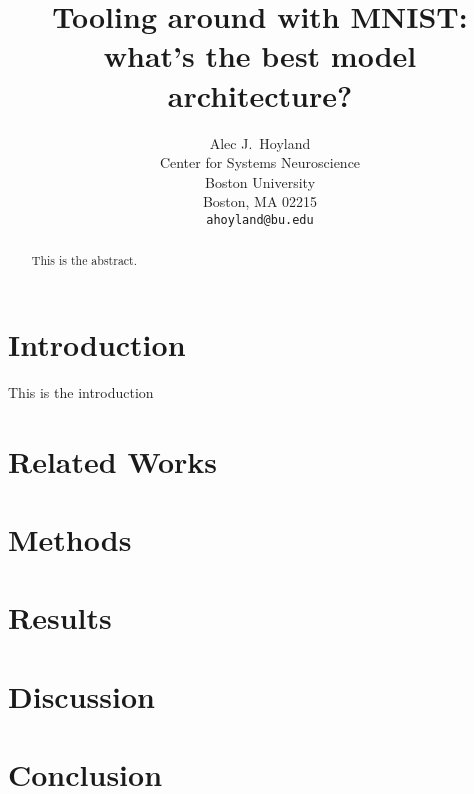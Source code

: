 \documentclass{article}
\title{Tooling around with MNIST: what's the best model architecture?}
\author{%
  Alec J.~Hoyland \\
  Center for Systems Neuroscience\\
  Boston University\\
  Boston, MA 02215 \\
  \texttt{ahoyland@bu.edu} \\
}
\begin{document}
\maketitle

\begin{abstract}
  This is the abstract.
\end{abstract}

\section{Introduction}

This is the introduction

\section{Related Works}

\section{Methods}

\section{Results}

\section{Discussion}

\section{Conclusion}
\end{document}
